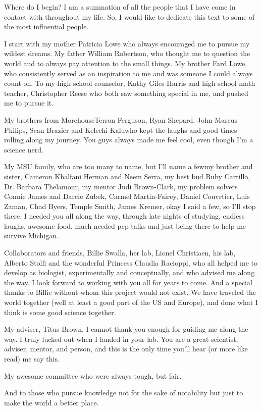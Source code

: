 Where do I begin? I am a summation of all the people that I have come in contact with throughout my life. So, I would like to dedicate this text to some of the most influential people. 

I start with my mother Patricia Lowe who always encouraged me to pursue my wildest dreams. My father William Robertson, who thought me to question the world and to always pay attention to the small things. My brother Fard Lowe, who consistently served as an inspiration to me and was someone I could always count on. To my high school counselor, Kathy Giles-Harris and high school math teacher, Christopher Reese who both saw something special in me, and pushed me to pursue it. 

My brothers from Morehouse\textemdash Terron Ferguson, Ryan Shepard, John-Marcus Philips, Sean Brazier and Kelechi Kalu\textemdash who kept the laughs and good times rolling along my journey. You guys always made me feel cool, even though I'm a science nerd.
  
My MSU family, who are too many to name, but I'll name a few\textemdash my brother and sister, Cameron Khalfani Herman and Neem Serra, my best bud Ruby Carrillo, Dr. Barbara Thelamour, my mentor Judi Brown-Clark, my problem solvers Connie James and Darcie Zubek, Carmel Martin-Fairey, Daniel Couvrtier, Luis Zaman, Chad Byers, Temple Smith, James Kremer, okay I said a few, so I'll stop there. I needed you all along the way, through late nights of studying, endless laughs, awesome food, much needed pep talks and just being there to help me survive Michigan.

Collaborators and friends, Billie Swalla, her lab, Lionel Christiaen, his lab, Alberto Stolfi and the wonderful Princess Claudia Racioppi, who all helped me to develop as biologist, experimentally and conceptually, and who advised me along the way. I look forward to working with you all for years to come. And a special thanks to Billie without whom this project would not exist. We have traveled the world together (well at least a good part of the US and Europe), and done what I think is some good science together.

My adviser, Titus Brown. I cannot thank you enough for guiding me along the way. I truly lucked out when I landed in your lab. You are a great scientist, adviser, mentor, and person, and this is the only time you'll hear (or more like read) me say this.

My awesome committee who were always tough, but fair.

And to those who pursue knowledge not for the sake of notability but just to make the world a better place.
